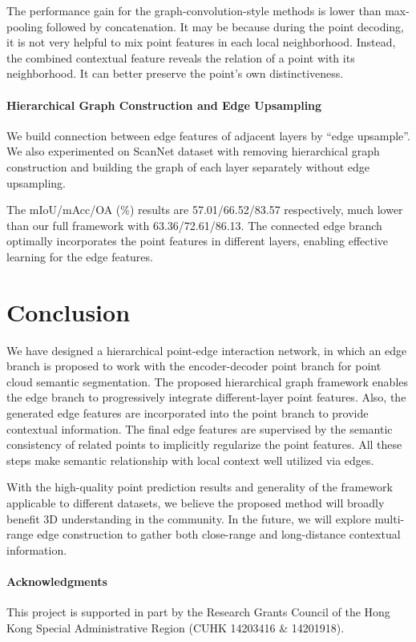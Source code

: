 \documentclass[10pt,twocolumn,letterpaper]{article}
\begin{document}
The performance gain for the graph-convolution-style methods is lower than max-pooling followed by concatenation. It may be because during the point decoding, it is not very helpful to mix point features in each local neighborhood. 
Instead, the combined contextual feature reveals the relation of a point with its neighborhood. It can better preserve the point's own distinctiveness.

\vspace{-3mm}
\paragraph{Hierarchical Graph Construction and Edge Upsampling}
We build connection between edge features of adjacent layers by ``edge upsample''.
We also experimented on ScanNet dataset with removing hierarchical graph construction and
building the graph of each layer separately without edge upsampling.

The mIoU/mAcc/OA (\%) results are 57.01/66.52/83.57 respectively, much lower than our full framework with 63.36/72.61/86.13. The connected edge branch optimally incorporates the point features in different layers, enabling effective learning for the edge features. 

\vspace{-1mm}
\section{Conclusion}
We have designed a hierarchical point-edge interaction network, in which an edge branch is proposed to work with the encoder-decoder point branch for point cloud semantic segmentation. The proposed hierarchical graph framework enables the edge branch to progressively integrate different-layer point features. Also, the generated edge features are incorporated into the point branch to provide contextual information. The final edge features are supervised by the semantic consistency of related points to implicitly regularize the point features. All these steps make semantic relationship with local context well utilized via edges.

With the high-quality point prediction results and generality of the framework applicable to different datasets, we believe the proposed method will broadly benefit 3D understanding in the community. In the future, we will explore multi-range edge construction to gather both close-range and long-distance contextual information.


\paragraph{Acknowledgments}
This project is supported in part by the Research Grants Council of the Hong Kong Special Administrative Region (CUHK 14203416 \& 14201918).

{\small
	
	
}
\end{document}

